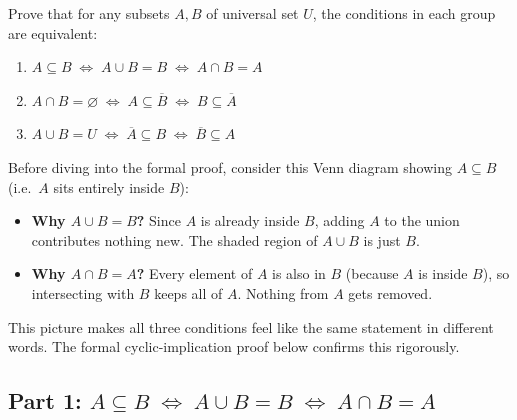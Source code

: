 \documentclass[12pt, a4paper]{article}
\newcommand{\comp}[1]{\overline{#1}}
\begin{document}
\begin{problembox}
Prove that for any subsets $A, B$ of universal set $U$,
the conditions in each group are equivalent:
\begin{enumerate}[nosep]
  \item $A \subseteq B \;\iff\; A \cup B = B \;\iff\; A \cap B = A$
  \item $A \cap B = \varnothing \;\iff\; A \subseteq \comp{B} \;\iff\; B \subseteq \comp{A}$
  \item $A \cup B = U \;\iff\; \comp{A} \subseteq B \;\iff\; \comp{B} \subseteq A$
\end{enumerate}
\end{problembox}

\begin{tcolorbox}[colback=theoryBg, colframe=theoryFrame!80!black, arc=2mm, left=5pt, right=5pt, top=5pt, bottom=5pt, title={\small Visual Intuition: Why These Conditions Are Equivalent}]
Before diving into the formal proof, consider this Venn diagram showing $A \subseteq B$ (i.e.\ $A$ sits entirely inside $B$):

\begin{center}
\end{center}

\begin{itemize}[nosep]
  \item \textbf{Why $A \cup B = B$?}\; Since $A$ is already inside $B$, adding $A$ to the union contributes nothing new. The shaded region of $A \cup B$ is just $B$.
  \item \textbf{Why $A \cap B = A$?}\; Every element of $A$ is also in $B$ (because $A$ is inside $B$), so intersecting with $B$ keeps all of $A$. Nothing from $A$ gets removed.
\end{itemize}

This picture makes all three conditions feel like the same statement in different words. The formal cyclic-implication proof below confirms this rigorously.
\end{tcolorbox}

\subsection*{Part 1:\; $A \subseteq B \;\iff\; A \cup B = B \;\iff\; A \cap B = A$}
\end{document}
